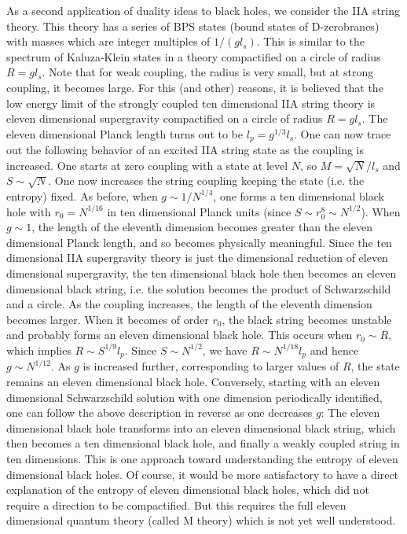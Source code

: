 \documentclass[12pt]{article}
\begin{document}
As a second application of duality ideas to black holes, we consider
the IIA string theory. This theory has a series of BPS states (bound
states of D-zerobranes) with
masses which are integer multiples of $1/(g l_s)$. This is similar to
the spectrum of Kaluza-Klein states in a theory compactified on a 
circle of radius $R = g l_s$. Note that for weak coupling, the radius is very
small, but at strong coupling, it becomes large. For this (and other) 
reasons, it is believed that the low energy limit of the strongly
coupled ten dimensional IIA string theory is eleven dimensional supergravity
compactified on a circle of radius $R = g l_s$. The eleven dimensional
Planck length turns out to be $l_p = g^{1/3} l_s$. One
can now trace out the following behavior of an excited IIA string state as
the coupling is increased. One starts at zero coupling with a
state at level $N$, so $M= \sqrt N/l_s$ and $S\sim \sqrt N$.
One now increases the string coupling keeping the state (i.e. the entropy)
fixed. As before,
when $g\sim 1/N^{1/4}$, one forms a ten dimensional black hole with
$r_0 = N^{1/16}$ in ten dimensional Planck units (since $S \sim r_0^8 \sim
N^{1/2}$). When $g\sim 1$, the length of the eleventh dimension becomes
greater than the eleven dimensional Planck length, and so becomes
physically meaningful. Since the ten dimensional IIA supergravity theory
is just the dimensional reduction of eleven dimensional supergravity,
the ten dimensional black hole then becomes
an eleven dimensional black string, i.e. the solution becomes the product
of Schwarzschild and a circle. As the coupling increases, the
length of the eleventh dimension becomes larger. 
When it becomes of
order $r_0$, the black string becomes unstable \cite{grla} and probably 
forms an eleven dimensional
black hole.  This occurs when $r_0 \sim R$, which implies $R
\sim S^{1/9} l_p$. Since $S\sim N^{1/2}$, we have $R \sim N^{1/18} l_p$
and hence $g\sim N^{1/12}$. As $g$ is increased further, corresponding 
to larger values of $R$, the state remains an eleven dimensional
black hole. Conversely, starting with an eleven dimensional Schwarzschild
solution with one dimension periodically identified, one can follow the
above description in reverse as one decreases $g$: The eleven
dimensional black hole transforms into an eleven dimensional black string,
which then becomes a ten dimensional black hole, and finally 
a weakly coupled string in ten dimensions. This is one approach toward
understanding the entropy of eleven dimensional black holes. Of course,
it would be more satisfactory to have a direct explanation of the
entropy of eleven dimensional
black holes, which did not require a  direction to be compactified.
But this requires the full eleven dimensional quantum theory (called M theory)
which is
not yet well understood.
\end{document}
